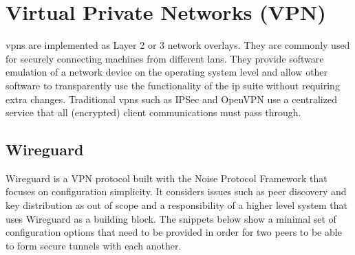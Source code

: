 \hypertarget{virtual-private-networks-vpn}{%
\section{Virtual Private Networks
(VPN)}\label{virtual-private-networks-vpn}}

\glspl{vpn} are implemented as Layer 2 or 3 network overlays. They are
commonly used for securely connecting machines from different
\glspl{lan}. They provide software emulation of a network device on the
operating system level and allow other software to transparently use the
functionality of the \gls{ip} suite without requiring extra changes.
Traditional \glspl{vpn} such as IPSec\autocite{ipSecDocs} and
OpenVPN\autocite{openVPNDocs} use a centralized service that all
(encrypted) client communications must pass through.

\hypertarget{wireguard}{%
\subsection{Wireguard}\label{wireguard}}

Wireguard\autocite{donenfeldWireGuardNextGeneration2017} is a VPN
protocol built with the Noise Protocol Framework\autocite{noiseProtocol}
that focuses on configuration simplicity. It considers issues such as
peer discovery and key distribution as out of scope and a responsibility
of a higher level system that uses Wireguard as a building block. The
snippets below show a minimal set of configuration options that need to
be provided in order for two peers to be able to form secure tunnels
with each another.

\begin{Shaded}
\begin{Highlighting}[]
\KeywordTok{[}\KeywordTok{]}
 \OperatorTok{=} \ErrorTok{/}
 \OperatorTok{=} 
 \OperatorTok{=} \OperatorTok{=}

\KeywordTok{[}\KeywordTok{]}
 \OperatorTok{=} \ErrorTok{+}\ErrorTok{+}\ErrorTok{/}\ErrorTok{+}\OperatorTok{=}
 \OperatorTok{=} \ErrorTok{/}
 \OperatorTok{=} \ErrorTok{:}
\end{Highlighting}
\end{Shaded}

